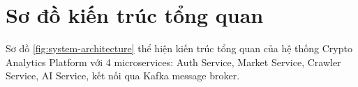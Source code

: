 
\section{Sơ đồ kiến trúc tổng quan}
\label{sec:overall-architecture}

Sơ đồ \ref{fig:system-architecture} thể hiện kiến trúc tổng quan của hệ thống Crypto Analytics Platform với 4 microservices: Auth Service, Market Service, Crawler Service, AI Service, kết nối qua Kafka message broker.

